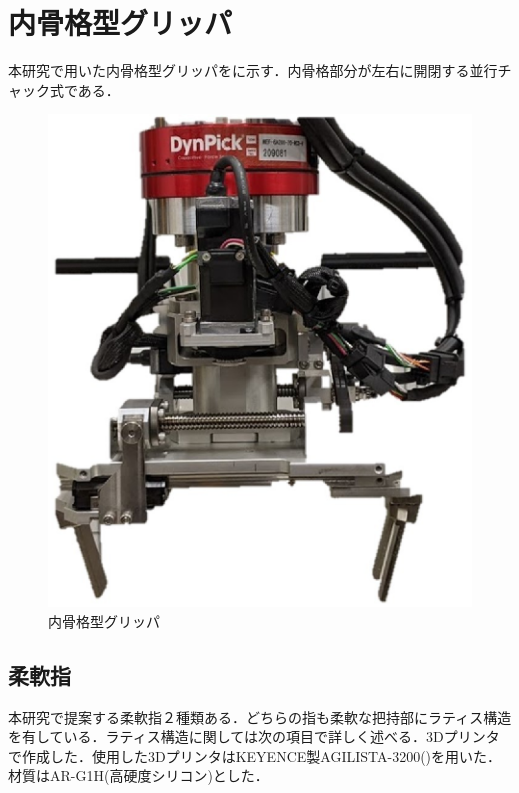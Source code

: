 \section{内骨格型グリッパ}
本研究で用いた内骨格型グリッパをに示す．内骨格部分が左右に開閉する並行チャック式である．

\begin{figure}[b]
 \begin{center}
  \includegraphics[scale=0.4]{../fig/eps/gripper.eps}
 \caption{内骨格型グリッパ}
  \label{fig::gripper}
 \end{center}
\end{figure}


\subsection{柔軟指}
本研究で提案する柔軟指２種類ある．どちらの指も柔軟な把持部にラティス構造を有している．ラティス構造に関しては次の項目で詳しく述べる．3Dプリンタで作成した．使用した3DプリンタはKEYENCE製AGILISTA-3200()を用いた．材質はAR-G1H(高硬度シリコン)とした．

